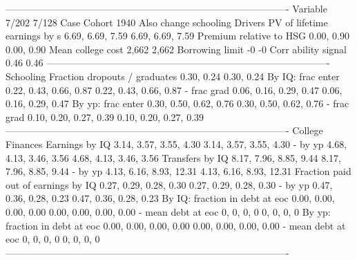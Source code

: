 ----------------------------------------------------------------------------------------
                              Variable                    7/202                    7/128
                                  Case              Cohort 1940    Also change schooling
                               Drivers                                                  
          PV of lifetime earnings by s         6.69, 6.69, 7.59         6.69, 6.69, 7.59
               Premium relative to HSG               0.00, 0.90               0.00, 0.90
                     Mean college cost                    2,662                    2,662
                       Borrowing limit                       -0                       -0
                   Corr ability signal                     0.46                     0.46
----------------------------------------------------------------------------------------
                             Schooling                                                  
         Fraction dropouts / graduates               0.30, 0.24               0.30, 0.24
                     By IQ: frac enter   0.22, 0.43, 0.66, 0.87   0.22, 0.43, 0.66, 0.87
                           - frac grad   0.06, 0.16, 0.29, 0.47   0.06, 0.16, 0.29, 0.47
                     By yp: frac enter   0.30, 0.50, 0.62, 0.76   0.30, 0.50, 0.62, 0.76
                           - frac grad   0.10, 0.20, 0.27, 0.39   0.10, 0.20, 0.27, 0.39
----------------------------------------------------------------------------------------
                      College Finances                                                  
                        Earnings by IQ   3.14, 3.57, 3.55, 4.30   3.14, 3.57, 3.55, 4.30
                               - by yp   4.68, 4.13, 3.46, 3.56   4.68, 4.13, 3.46, 3.56
                       Transfers by IQ   8.17, 7.96, 8.85, 9.44   8.17, 7.96, 8.85, 9.44
                               - by yp  4.13, 6.16, 8.93, 12.31  4.13, 6.16, 8.93, 12.31
   Fraction paid out of earnings by IQ   0.27, 0.29, 0.28, 0.30   0.27, 0.29, 0.28, 0.30
                               - by yp   0.47, 0.36, 0.28, 0.23   0.47, 0.36, 0.28, 0.23
        By IQ: fraction in debt at eoc   0.00, 0.00, 0.00, 0.00   0.00, 0.00, 0.00, 0.00
                    - mean debt at eoc               0, 0, 0, 0               0, 0, 0, 0
        By yp: fraction in debt at eoc   0.00, 0.00, 0.00, 0.00   0.00, 0.00, 0.00, 0.00
                    - mean debt at eoc               0, 0, 0, 0               0, 0, 0, 0
----------------------------------------------------------------------------------------
